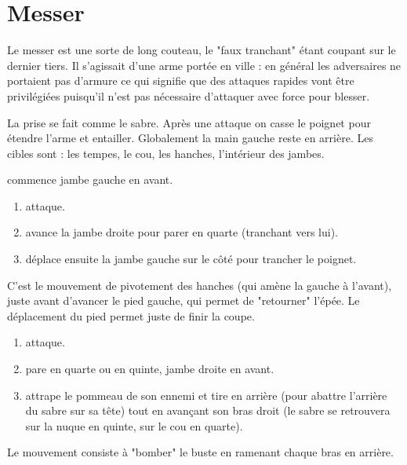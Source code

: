 \chapter{Messer}


Le messer est une sorte de long couteau, le "faux tranchant" étant coupant sur le dernier tiers.
Il s'agissait d'une arme portée en ville : en général les adversaires ne portaient pas d'armure ce qui signifie que des attaques rapides vont être privilégiées puisqu'il n'est pas nécessaire d'attaquer avec force pour blesser.

La prise se fait comme le sabre.
Après une attaque on casse le poignet pour étendre l'arme et entailler.
Globalement la main gauche reste en arrière.
Les cibles sont : les tempes, le cou, les hanches, l'intérieur des jambes.


\begin{technique}

\D commence jambe gauche en avant.

\begin{enumerate}
	\item \A attaque.
	
	\item \D avance la jambe droite pour parer en quarte (tranchant vers lui).
	
	\item \D déplace ensuite la jambe gauche sur le côté pour trancher le poignet.
\end{enumerate}

C'est le mouvement de pivotement des hanches (qui amène la gauche à l'avant), juste avant d'avancer le pied gauche, qui permet de "retourner" l'épée.
Le déplacement du pied permet juste de finir la coupe.
\end{technique}


\begin{technique}

\begin{enumerate}
	\item \A attaque.
	
	\item \D pare en quarte ou en quinte, jambe droite en avant.
	
	\item \D attrape le pommeau de son ennemi et tire en arrière (pour abattre l'arrière du sabre sur sa tête) tout en avançant son bras droit (le sabre se retrouvera sur la nuque en quinte, sur le cou en quarte).
\end{enumerate}

Le mouvement consiste à "bomber" le buste en ramenant chaque bras en arrière.
\end{technique}


